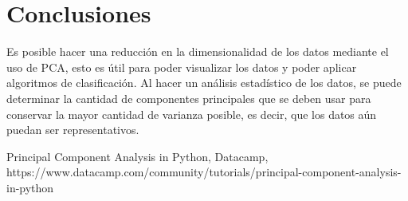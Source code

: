 \documentclass[conference]{IEEEtran}
\begin{document}
\section{Conclusiones}

Es posible hacer una reducción en la dimensionalidad de los datos mediante el uso de PCA, esto es útil para poder visualizar los datos y poder aplicar algoritmos de clasificación. Al hacer un análisis estadístico de los datos, se puede determinar la cantidad de componentes principales que se deben usar para conservar la mayor cantidad de varianza posible, es decir, que los datos aún puedan ser representativos.

\begin{thebibliography}{00}
  Principal Component Analysis in Python, Datacamp, https://www.datacamp.com/community/tutorials/principal-component-analysis-in-python
\end{thebibliography}
\end{document}
